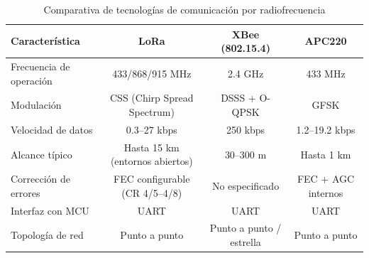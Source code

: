 \begin{table}[h]
    \centering
    \footnotesize
    \begin{tabular}{|l|c|c|c|}
        \hline
        \textbf{Característica} & \textbf{LoRa}                   & \textbf{XBee (802.15.4)} & \textbf{APC220}    \\
        \hline
        Frecuencia de operación & 433/868/915 MHz                 & 2.4 GHz                  & 433 MHz            \\
        \hline
        Modulación              & CSS (Chirp Spread Spectrum)     & DSSS + O-QPSK            & GFSK               \\
        \hline
        Velocidad de datos      & 0.3–27 kbps                     & 250 kbps                 & 1.2–19.2 kbps      \\
        \hline
        Alcance típico          & Hasta 15 km (entornos abiertos) & 30–300 m                 & Hasta 1 km         \\
        \hline
        Corrección de errores   & FEC configurable (CR 4/5–4/8)   & No especificado          & FEC + AGC internos \\
        \hline
        Interfaz con MCU        & UART                            & UART                     & UART               \\
        \hline
        Topología de red        & Punto a punto                   & Punto a punto / estrella & Punto a punto      \\
        \hline
    \end{tabular}
    \caption{Comparativa de tecnologías de comunicación por radiofrecuencia}
    \label{tab:comparativa_rf}
\end{table}


